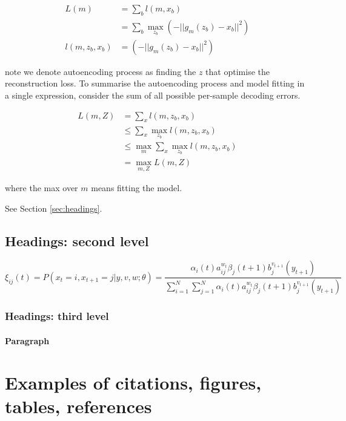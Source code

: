 \documentclass{article}
\begin{document}
    \begin{align*} 
	L(m) &= \sum_b l(m,x_b) \\
	     &= \sum_b \max_{z_b} \left(-||g_m(z_b) - x_b||^2  
		 \right) \\ 
	l(m,z_b,x_b) &= \left(-||g_m(z_b) - x_b||^2  
		 \right) 
	\end{align*}
	
	note we denote autoencoding process as finding the $z$ 
	that optimise the reconstruction loss. To summarise the autoencoding
	process and model fitting in a single expression,
	consider the sum of all possible per-sample decoding errors.

    \begin{align*} 
	L(m,Z) &= \sum_x l(m,z_b,x_b)  \\
	&\leq \sum_x \max_{z_b} l(m,z_b,x_b)  
	\\
	&\leq \max_{m} \sum_x \max_{z_b} l(m,z_b,x_b) \\
	&= \max_{m,Z} L(m,Z)
	\end{align*}

	where the max over $m$ means fitting the model.

	\label{sec:headings}

\lipsum[4] See Section \ref{sec:headings}.

\subsection{Headings: second level}
\lipsum[5]
\begin{equation}
	\xi _{ij}(t)=P(x_{t}=i,x_{t+1}=j|y,v,w;\theta)= {\frac {\alpha _{i}(t)a^{w_t}_{ij}\beta _{j}(t+1)b^{v_{t+1}}_{j}(y_{t+1})}{\sum _{i=1}^{N} \sum _{j=1}^{N} \alpha _{i}(t)a^{w_t}_{ij}\beta _{j}(t+1)b^{v_{t+1}}_{j}(y_{t+1})}}
\end{equation}

\subsubsection{Headings: third level}
\lipsum[6]

\paragraph{Paragraph}
\lipsum[7]



\section{Examples of citations, figures, tables, references}
\label{sec:others}
\end{document}
